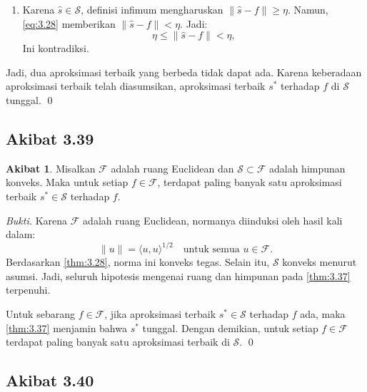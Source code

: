 \documentclass[aspectratio=169,11pt]{beamer}
\theoremstyle{definition}
\newtheorem{akibat}{Akibat}
\newcommand{\myref}[1]{\hyperref[#1]{\nameCref{#1} \ref*{#1}}}
\begin{document}
\begin{frame}[allowframebreaks=1]{\insertsection}{\insertsubsection}
\begin{enumerate}
    \item Karena $\widehat{s}\in\mathcal{S}$, definisi infimum mengharuskan $\|\widehat{s}-f\|\geq\eta$. Namun, \eqref{eq:3.28} memberikan $\|\widehat{s}-f\|<\eta$. Jadi:
          \begin{equation*}
            \eta\leq\|\widehat{s}-f\|<\eta,
          \end{equation*}
          Ini kontradiksi.
  \end{enumerate}

  Jadi, dua aproksimasi terbaik yang berbeda tidak dapat ada. Karena keberadaan aproksimasi terbaik telah diasumsikan, aproksimasi terbaik $s^*$ terhadap $f$ di $\mathcal{S}$ tunggal. \qed
\end{frame}

\subsection{Akibat 3.39}

\begin{frame}[allowframebreaks=1]{\insertsection}{\insertsubsection}
  \setcounter{akibat}{38}
  \begin{akibat}
    Misalkan $\mathcal{F}$ adalah ruang Euclidean dan $\mathcal{S}\subset\mathcal{F}$ adalah himpunan konveks. Maka untuk setiap $f\in\mathcal{F}$, terdapat paling banyak satu aproksimasi terbaik $s^*\in\mathcal{S}$ terhadap $f$.\label{cor:3.39}
  \end{akibat}

  \textit{Bukti.}
  Karena $\mathcal{F}$ adalah ruang Euclidean, normanya diinduksi oleh hasil kali dalam:
  \begin{equation*}
    \|u\|=\langle u,u\rangle^{1/2} \quad \text{untuk semua } u\in\mathcal{F}.
  \end{equation*}
  Berdasarkan \myref{thm:3.28}, norma ini konveks tegas. Selain itu, $\mathcal{S}$ konveks menurut asumsi. Jadi, seluruh hipotesis mengenai ruang dan himpunan pada \myref{thm:3.37} terpenuhi.

  Untuk sebarang $f\in\mathcal{F}$, jika aproksimasi terbaik $s^*\in\mathcal{S}$ terhadap $f$ ada, maka \myref{thm:3.37} menjamin bahwa $s^*$ tunggal. Dengan demikian, untuk setiap $f\in\mathcal{F}$ terdapat paling banyak satu aproksimasi terbaik di $\mathcal{S}$. \qed
\end{frame}

\subsection{Akibat 3.40}
\end{document}
